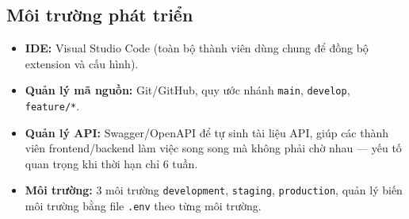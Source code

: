 \subsection{Môi trường phát triển}
\begin{itemize}
    \item \textbf{IDE:} Visual Studio Code (toàn bộ thành viên dùng
    chung để đồng bộ extension và cấu hình).
    \item \textbf{Quản lý mã nguồn:} Git/GitHub, quy ước nhánh
    \texttt{main}, \texttt{develop}, \texttt{feature/*}.
    \item \textbf{Quản lý API:} Swagger/OpenAPI để tự sinh tài liệu API,
    giúp các thành viên frontend/backend làm việc song song mà không
    phải chờ nhau — yếu tố quan trọng khi thời hạn chỉ 6 tuần.
    \item \textbf{Môi trường:} 3 môi trường \texttt{development},
    \texttt{staging}, \texttt{production}, quản lý biến môi trường bằng
    file \texttt{.env} theo từng môi trường.
\end{itemize}